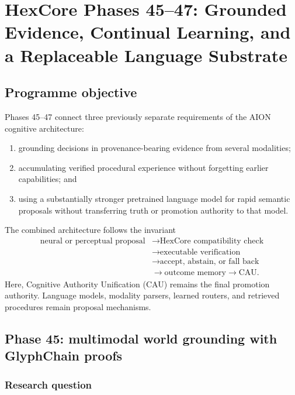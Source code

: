 \section{HexCore Phases 45--47: Grounded Evidence, Continual Learning, and a Replaceable Language Substrate}
\label{sec:hexcore-phases-45-47-grounding-continual-substrate}

\subsection{Programme objective}

Phases 45--47 connect three previously separate requirements of the AION
cognitive architecture:
\begin{enumerate}
    \item grounding decisions in provenance-bearing evidence from several
    modalities;
    \item accumulating verified procedural experience without forgetting
    earlier capabilities; and
    \item using a substantially stronger pretrained language model for rapid
    semantic proposals without transferring truth or promotion authority to
    that model.
\end{enumerate}

The combined architecture follows the invariant
\[
\begin{aligned}
\text{neural or perceptual proposal}
&\rightarrow \text{HexCore compatibility check}\\
&\rightarrow \text{executable verification}\\
&\rightarrow \text{accept, abstain, or fall back}\\
&\rightarrow \text{outcome memory}
\rightarrow \text{CAU}.
\end{aligned}
\]
Here, Cognitive Authority Unification (CAU) remains the final promotion
authority.  Language models, modality parsers, learned routers, and retrieved
procedures remain proposal mechanisms.

\subsection{Phase 45: multimodal world grounding with GlyphChain proofs}
\label{subsec:phase45-multimodal-glyphchain}

\subsubsection{Research question}

